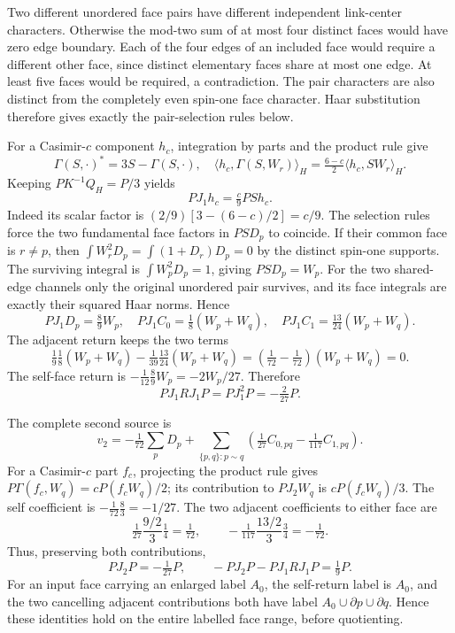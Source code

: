 \documentclass[11pt]{article}
\begin{document}
Two different unordered face pairs have different independent link-center characters. Otherwise the mod-two sum of at most four distinct faces would have zero edge boundary. Each of the four edges of an included face would require a different other face, since distinct elementary faces share at most one edge. At least five faces would be required, a contradiction. The pair characters are also distinct from the completely even spin-one face character. Haar substitution therefore gives exactly the pair-selection rules below.

For a Casimir-\(c\) component \(h_c\), integration by parts and the product rule give
\[
 \Gamma(S,\cdot)^*=3S-\Gamma(S,\cdot),\quad
 \langle h_c,\Gamma(S,W_r)\rangle_H
 =\tfrac{6-c}{2}\langle h_c,SW_r\rangle_H .
\]
Keeping \(PK^{-1}Q_H=P/3\) yields
\[
 PJ_1h_c=\tfrac c9PSh_c. \tag{P28}
\]
Indeed its scalar factor is \((2/9)[3-(6-c)/2]=c/9\).
The selection rules force the two fundamental face factors in \(PSD_p\) to coincide. If their common face is \(r\ne p\), then \(\int W_r^2D_p=\int(1+D_r)D_p=0\) by the distinct spin-one supports. The surviving integral is \(\int W_p^2D_p=1\), giving \(PSD_p=W_p\). For the two shared-edge channels only the original unordered pair survives, and its face integrals are exactly their squared Haar norms. Hence
\[
 PJ_1D_p=\tfrac89W_p,\quad
 PJ_1C_0=\tfrac18(W_p+W_q),\quad
 PJ_1C_1=\tfrac{13}{24}(W_p+W_q).
\]
The adjacent return keeps the two terms
\[
 \tfrac19\tfrac18(W_p+W_q)
 -\tfrac1{39}\tfrac{13}{24}(W_p+W_q)
 =(\tfrac1{72}-\tfrac1{72})(W_p+W_q)=0.
\]
The self-face return is \(-\tfrac1{12}\tfrac89W_p=-2W_p/27\). Therefore
\[
 PJ_1RJ_1P=PJ_1^2P=-\tfrac2{27}P. \tag{P29}
\]

The complete second source is
\[
 v_2=-\tfrac1{72}\sum_pD_p+
 \sum_{\{p,q\}:p\sim q}
 \left(\tfrac1{27}C_{0,pq}-\tfrac1{117}C_{1,pq}\right).
\]
For a Casimir-\(c\) part \(f_c\), projecting the product rule gives
\(P\Gamma(f_c,W_q)=cP(f_cW_q)/2\); its contribution to \(PJ_2W_q\) is \(cP(f_cW_q)/3\). The self coefficient is
\(-\tfrac1{72}\tfrac83=-1/27\). The two adjacent coefficients to either face are
\[
 \tfrac1{27}\frac{9/2}{3}\tfrac14=\tfrac1{72},\qquad
 -\tfrac1{117}\frac{13/2}{3}\tfrac34=-\tfrac1{72}.
\]
Thus, preserving both contributions,
\[
 PJ_2P=-\tfrac1{27}P,\qquad
 -PJ_2P-PJ_1RJ_1P=\tfrac19P. \tag{P30}
\]
For an input face carrying an enlarged label \(A_0\), the self-return label is \(A_0\), and the two cancelling adjacent contributions both have label \(A_0\cup\partial p\cup\partial q\). Hence these identities hold on the entire labelled face range, before quotienting.
\end{document}
